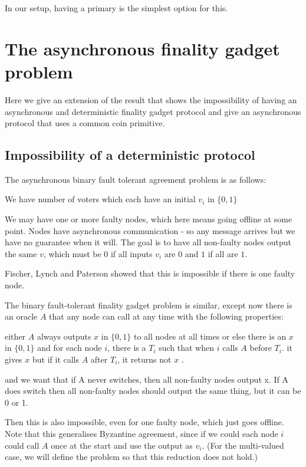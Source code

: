 \documentclass{article}
\begin{document}
In our setup, having a primary is the simplest option for this.

\section{The asynchronous finality gadget problem}

Here we give an extension of the \cite{flp} result that shows the impossibility of having an asynchronous and deterministic finality gadget protocol and give an asynchronous protocol that uses a common coin primitive.

\subsection{Impossibility of a deterministic protocol} \label{ssec:impossibility}

The asynchronous binary fault tolerant agreement problem is as follows:

We have  number of voters which each have an initial $v_i$ in $\{0,1\}$

We may have one or more faulty nodes, which here means going offline at some point. Nodes have asynchronous communication - so any message arrives but we have no guarantee when it will.
The goal is to have all non-faulty nodes output the same $v$, which must be $0$ if all inputs $v_i$ are $0$ and $1$ if all are $1$.

Fischer, Lynch and Paterson\cite{flp} showed that this is impossible if there is one faulty node.

The binary fault-tolerant finality gadget problem is similar, except now there is an oracle $A$ that any node can call at any time with the following properties:

either $A$ always outputs $x$ in $\{0,1\}$ to all nodes at all times
or else there is an $x$ in $\{0,1\}$ and
for each node $i$, there is a $T_i$ such that when $i$ calls $A$ before $T_i$. it gives $x$ but if it calls $A$ after $T_i$, it returns not $x$ .

and we want that if A never switches, then all non-faulty nodes output x. If A does switch then all non-faulty nodes should output the same thing, but it can be 0 or 1. 

Then this is also impossible, even for one faulty node, which just goes offline. Note that this generalises Byzantine agreement, since if we could each node $i$ could call $A$ once at the start and use the output as $v_i$. (For the multi-valued case, we will define the problem so that this reduction does not hold.)
\end{document}
